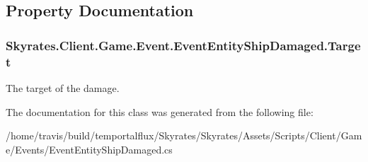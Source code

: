 \subsection{Property Documentation}
\hypertarget{class_skyrates_1_1_client_1_1_game_1_1_event_1_1_event_entity_ship_damaged_abfb55cdb6205f8e4ecf35b8c93ae39b6}{
\subsubsection[{Target}]{ Skyrates.\-Client.\-Game.\-Event.\-Event\-Entity\-Ship\-Damaged.\-Target\hspace{0.3cm}{\ttfamily [get]}}}\label{class_skyrates_1_1_client_1_1_game_1_1_event_1_1_event_entity_ship_damaged_abfb55cdb6205f8e4ecf35b8c93ae39b6}


The target of the damage. 



The documentation for this class was generated from the following file\-:\begin{DoxyCompactItemize}
\item 
/home/travis/build/temportalflux/\-Skyrates/\-Skyrates/\-Assets/\-Scripts/\-Client/\-Game/\-Events/Event\-Entity\-Ship\-Damaged.\-cs\end{DoxyCompactItemize}

